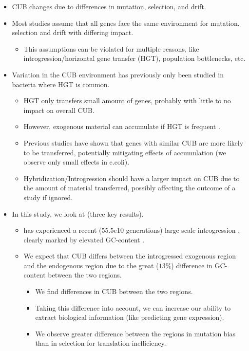 \documentclass[12pt]{article}
\begin{document}
\begin{itemize}
	\item CUB changes due to differences in mutation, selection, and drift.
	\item Most studies assume that all genes face the same environment for mutation, selection and drift with differing impact.
	\begin{itemize}
		\item This assumptions can be violated for multiple reasons, like introgression/horizontal gene transfer (HGT), population bottlenecks, etc.
	\end{itemize}
	 \item Variation in the CUB environment has previously only been studied in bacteria where HGT is common.
	\begin{itemize}
		\item HGT only transfers small amount of genes, probably with little to no impact on overall CUB.
		\item However, exogenous material can accumulate if HGT is frequent \citep{lawrence1997}.
		\item Previous studies have shown that genes with similar CUB are more likely to be transferred, potentially mitigating effects of accumulation \citep{tuller2011} (we observe only small effects in e.coli).
		\item Hybridization/Introgression should have a larger impact on CUB due to the amount of material transferred, possibly affecting the outcome of a study if ignored. 
	\end{itemize}
	\item In this study, we look at \kluyveri (three key results).
	\begin{itemize}
		\item \kluyveri has experienced a recent ($55.5e10$ generations) large scale introgression \citep{friedrich2015}, clearly marked by elevated GC-content \citep{payen2009}.
		\item We expect that CUB differs between the introgressed exogenous region and the endogenous region due to the great ($13 \%$) difference in GC-content between the two regions.
		\begin{itemize}
			\item We find differences in CUB between the two regions.
			\item Taking this difference into account, we can increase our ability to extract biological information (like predicting gene expression).
			\item We observe greater difference between the regions in mutation bias than in selection for translation inefficiency.

\end{itemize}
\end{itemize}
\end{itemize}
\end{document}
